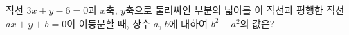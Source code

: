 직선 $3x+y-6=0$과 $x$축, $y$축으로 둘러싸인 부분의 넓이를 이 직선과 평행한 직선 $ax+y+b=0$이 이등분할 때, 상수 $a$, $b$에 대하여 $b^2-a^2$의 값은?
